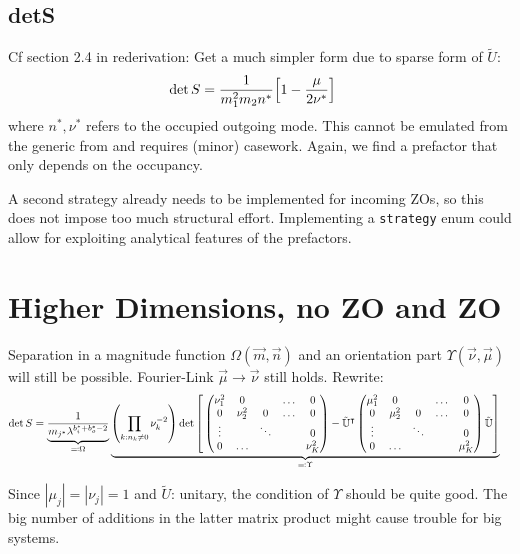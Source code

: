 \documentclass[
	english,
	a4paper,
	fontsize=10pt,
	parskip=half,
	titlepage=true,
	DIV=12,
	final
]{scrreprt}
\newcommand*{\transp}{\ensuremath{^\intercal}}
\begin{document}
\subsection{detS}
Cf section 2.4 in rederivation: Get a much simpler form due to sparse form of $\tilde{U}$:
\begin{align}
	\det S
&=
	\frac{1}{m_1^2 m_2 n^*}
	\qty[
		1 - \frac{\mu}{2\nu^*}
	]
\end{align}
where $n^*, \nu^*$ refers to the occupied outgoing mode. This cannot be emulated from the generic from and requires (minor) casework. Again, we find a prefactor that only depends on the occupancy.

A second strategy already needs to be implemented for incoming ZOs, so this does not impose too much structural effort. Implementing a \texttt{strategy} enum could allow for exploiting analytical features of the prefactors.

\section{Higher Dimensions, no ZO and ZO}
Separation in a magnitude function $\Omega(\vec{m}, \vec{n})$ and an orientation part $\Upsilon(\vec{\nu}, \vec{\mu})$ will still be possible. Fourier-Link $\vec{\mu} \to \vec{\nu}$ still holds.
Rewrite:
\begin{align}
	\det S
&=
	\underbrace{
		\frac{ 1 }{ m_{j^*} \lambda^{b_i^* + b_o^* - 2} }
	}_{\eqqcolon \Omega}
	\underbrace{
		\qty( \prod_{k: n_k \neq 0} \nu_k^{-2} )
		\det\qty[\bigg.
			\begin{pmatrix}
				\nu_1^2 & 0 && \ldots  & 0 \\
				0 & \nu_2^2 & 0 & \ldots & 0 \\
				\vdots & & \ddots & & 0 \\
				0 & \ldots &&& \nu_K^2
			\end{pmatrix}
			-
			\tilde{\mathbb{U}}\transp
			\begin{pmatrix}
				\mu_1^2 & 0 && \ldots  & 0 \\
				0 & \mu_2^2 & 0 & \ldots & 0 \\
				\vdots & & \ddots & & 0 \\
				0 & \ldots &&& \mu_K^2
			\end{pmatrix}
			\tilde{\mathbb{U}}
		]
	}_{\eqqcolon \Upsilon}
\end{align}

Since $|\mu_j| = |\nu_j| = 1$ and $\tilde{U}$: unitary, the condition of $\Upsilon$ should be quite good. The big number of additions in the latter matrix product might cause trouble for big systems.
\end{document}
